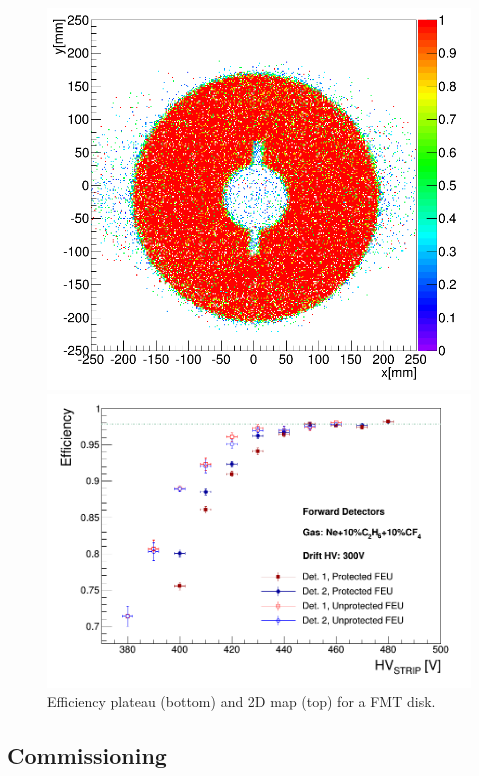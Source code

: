 \begin{figure}[htb]
 \includegraphics[width=1.0\columnwidth,keepaspectratio]{images/FMT_eff_2Dmap_testBench.png}
 
 \includegraphics[width=1.0\columnwidth,keepaspectratio]{images/FMT_eff_plateau_testBench.png}
 
 \caption{Efficiency plateau (bottom) and 2D map (top) for a FMT disk.}
 \label{fig:mm-fig9}
\end{figure}

\subsection{Commissioning}

